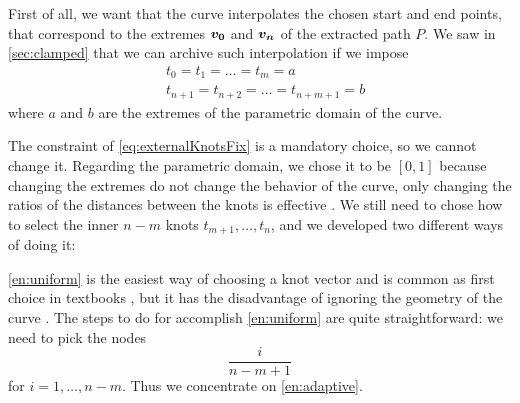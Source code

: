 \documentclass[dissertation.tex]{subfiles}
\begin{document}
First of all, we want that
the curve interpolates
the chosen start and end points, that correspond to the extremes
$\boldsymbol{v_0}$ and $\boldsymbol{v_n}$ of the extracted path $P$. We saw in
\cref{sec:clamped} that we can archive such interpolation if we impose
\begin{equation}\label{eq:externalKnotsFix}
  \begin{split}
    &t_0 = t_1 = \dots = t_{m} = a\\
    &t_{n+1} = t_{n+2} = \dots = t_{n+m+1} = b
  \end{split}
\end{equation}
where $a$ and $b$ are the extremes of the parametric domain of
the curve.

The constraint of \cref{eq:externalKnotsFix} is a mandatory
choice, so we cannot change it. Regarding the parametric domain, we
chose it to be $[0,1]$ because changing the extremes do not change
the behavior of the curve, only changing the ratios of the distances
between the knots is effective \cite{farin}. We still need to chose how to select 
the inner $n-m$ knots $t_{m+1},\dots,t_n$, and we developed two different
ways of doing it:

\cref{en:uniform} is the easiest way of choosing a knot vector
and is common as first choice in textbooks \cite{farin}\cite{docarmo},
but it has the disadvantage of ignoring the geometry of the curve
\cite{farin}. The steps to do for accomplish \cref{en:uniform} are quite
straightforward: we need to pick the nodes
\begin{equation*}
  \frac{i}{n-m+1}
\end{equation*}
for $i=1,\dots,n-m$. Thus we concentrate on \cref{en:adaptive}.
\end{document}
